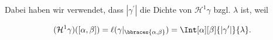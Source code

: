 \begin{solution}
Dabei haben wir verwendet, dass $|\gamma^\prime|$ die Dichte von $\mathcal H^1 \gamma$ bzgl. $\lambda$ ist, weil

\begin{align*}
    (\mathcal H^1 \gamma)([\alpha, \beta])
    =
    \ell(\gamma |_\bbraces{\alpha, \beta})
    =
    \Int[\alpha][\beta]
    {
        |\gamma^\prime|
    }{\lambda}.
\end{align*}

\end{solution}

